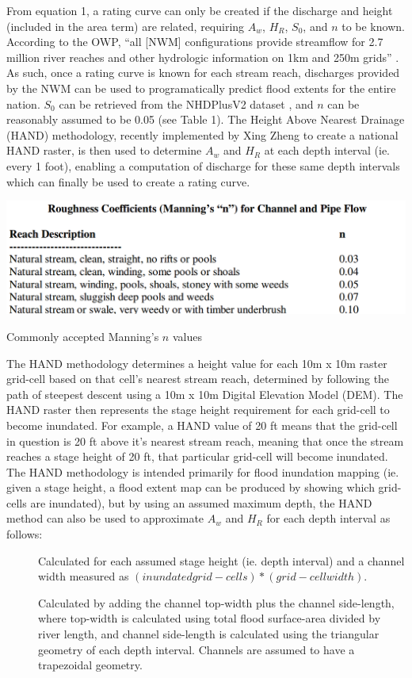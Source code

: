 \documentclass[11pt]{article}
\begin{document}
From equation 1, a rating curve can only be created if the discharge and height (included in the area term) are related, requiring $A_w$, $H_R$, $S_0$, and $n$ to be known. According to the OWP, ``all [NWM] configurations provide streamflow for 2.7 million river reaches and other hydrologic information on 1km and 250m grids'' \cite{nwmsummary}. As such, once a rating curve is known for each stream reach, discharges provided by the NWM can be used to programatically predict flood extents for the entire nation. $S_0$ can be retrieved from the NHDPlusV2 dataset \cite{nhdplusv2}, and $n$ can be reasonably assumed to be 0.05 (see Table 1). The Height Above Nearest Drainage (HAND) methodology, recently implemented by Xing Zheng to create a national HAND raster, is then used to determine $A_w$ and $H_R$ at each depth interval (ie. every 1 foot), enabling a computation of discharge for these same depth intervals which can finally be used to create a rating curve. 

\begin{table}[h]
\centering
\includegraphics[keepaspectratio, width=.8\textwidth]{n_vals.png}
\caption{Commonly accepted Manning's $n$ values \cite{roughnesstable}}
\end{table}

The HAND methodology determines a height value for each 10m x 10m raster grid-cell based on that cell's nearest stream reach, determined by following the path of steepest descent using a 10m x 10m Digital Elevation Model (DEM). The HAND raster then represents the stage height requirement for each grid-cell to become inundated. For example, a HAND value of 20 ft means that the grid-cell in question is 20 ft above it's nearest stream reach, meaning that once the stream reaches a stage height of 20 ft, that particular grid-cell will become inundated. The HAND methodology is intended primarily for flood inundation mapping (ie. given a stage height, a flood extent map can be produced by showing which grid-cells are inundated), but by using an assumed maximum depth, the HAND method can also be used to approximate $A_w$ and $H_R$ for each depth interval as follows: 

\begin{description}
  \item[] Calculated for each assumed stage height (ie. depth interval) and a channel width measured as $(inundated grid-cells)*(grid-cell width)$.
  \item[] Calculated by adding the channel top-width plus the channel side-length, where top-width is calculated using total flood surface-area divided by river length, and channel side-length is calculated using the triangular geometry of each depth interval. Channels are assumed to have a trapezoidal geometry. 
\end{description}
\end{document}

